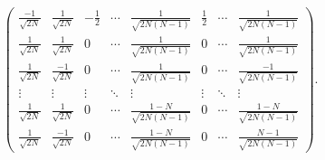 \begin{example}
\[\begin{pmatrix}
             \frac{-1}{\sqrt{2N}} & \frac{1}{\sqrt{2N}}  & -\frac12 & \cdots & \frac{1}{\sqrt{2N(N-1)}}   & \frac12  & \cdots & \frac{1}{\sqrt{2N(N-1)}} \\
             \frac{1}{\sqrt{2N}}  & \frac{1}{\sqrt{2N}}  & 0        & \cdots & \frac{1}{\sqrt{2N(N-1)}}   & 0        & \cdots & \frac{1}{\sqrt{2N(N-1)}} \\
             \frac{1}{\sqrt{2N}}  & \frac{-1}{\sqrt{2N}} & 0        & \cdots & \frac{1}{\sqrt{2N(N-1)}}   & 0        & \cdots & \frac{-1}{\sqrt{2N(N-1)}} \\
             \vdots               & \vdots               & \vdots   & \ddots & \vdots                     & \vdots   & \ddots & \vdots \\
             \frac{1}{\sqrt{2N}}  & \frac{1}{\sqrt{2N}}  & 0        & \cdots & \frac{1-N}{\sqrt{2N(N-1)}} & 0        & \cdots & \frac{1-N}{\sqrt{2N(N-1)}} \\
             \frac{1}{\sqrt{2N}}  & \frac{-1}{\sqrt{2N}} & 0        & \cdots & \frac{1-N}{\sqrt{2N(N-1)}} & 0        & \cdots & \frac{N-1}{\sqrt{2N(N-1)}}
         \end{pmatrix}. \]
 \end{example}
